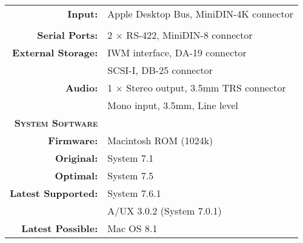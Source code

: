 \begin{tabular}{ r p{6in} }
\\
\textbf{Input:} & Apple Desktop Bus, MiniDIN-4K connector \\
\\
\textbf{Serial Ports:} & 2 \(\times\) RS-422, MiniDIN-8 connector \\
\textbf{External Storage:} & IWM interface, DA-19 connector \\
~ & SCSI-I, DB-25 connector \\
\textbf{Audio:} & 1 \(\times\) Stereo output, 3.5mm TRS connector \\
~ & Mono input, 3.5mm, Line level
\\
\textbf{\textsc{System Software}} & ~ \\
\textbf{Firmware:} & Macintosh ROM (1024k) \\
\textbf{Original:} & System 7.1 \\
\textbf{Optimal:} & System 7.5 \\
\textbf{Latest Supported:} & System 7.6.1 \\
~ & A/UX 3.0.2 (System 7.0.1) \\
\textbf{Latest Possible:} & Mac OS 8.1 \\
\end{tabular}
